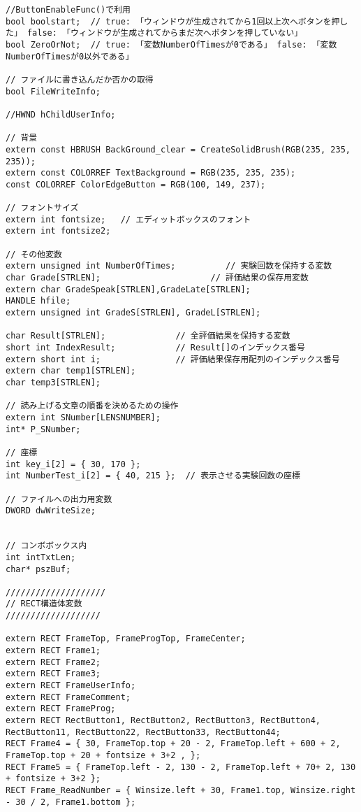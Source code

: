 \begin{verbatim}
//ButtonEnableFunc()で利用
bool boolstart;  // true: 「ウィンドウが生成されてから1回以上次へボタンを押した」 false: 「ウィンドウが生成されてからまだ次へボタンを押していない」
bool ZeroOrNot;  // true: 「変数NumberOfTimesが0である」 false: 「変数NumberOfTimesが0以外である」

// ファイルに書き込んだか否かの取得
bool FileWriteInfo;

//HWND hChildUserInfo;

// 背景
extern const HBRUSH BackGround_clear = CreateSolidBrush(RGB(235, 235, 235));
extern const COLORREF TextBackground = RGB(235, 235, 235);
const COLORREF ColorEdgeButton = RGB(100, 149, 237);

// フォントサイズ
extern int fontsize;   // エディットボックスのフォント
extern int fontsize2;

// その他変数
extern unsigned int NumberOfTimes;          // 実験回数を保持する変数
char Grade[STRLEN];                      // 評価結果の保存用変数
extern char GradeSpeak[STRLEN],GradeLate[STRLEN];
HANDLE hfile;
extern unsigned int GradeS[STRLEN], GradeL[STRLEN];

char Result[STRLEN];              // 全評価結果を保持する変数
short int IndexResult;            // Result[]のインデックス番号 
extern short int i;               // 評価結果保存用配列のインデックス番号
extern char temp1[STRLEN];
char temp3[STRLEN];

// 読み上げる文章の順番を決めるための操作
extern int SNumber[LENSNUMBER];
int* P_SNumber;

// 座標
int key_i[2] = { 30, 170 };         
int NumberTest_i[2] = { 40, 215 };  // 表示させる実験回数の座標

// ファイルへの出力用変数
DWORD dwWriteSize;


// コンボボックス内
int intTxtLen;
char* pszBuf;

////////////////////
// RECT構造体変数
///////////////////
 
extern RECT FrameTop, FrameProgTop, FrameCenter;
extern RECT Frame1;
extern RECT Frame2;
extern RECT Frame3;
extern RECT FrameUserInfo;
extern RECT FrameComment;
extern RECT FrameProg;
extern RECT RectButton1, RectButton2, RectButton3, RectButton4, RectButton11, RectButton22, RectButton33, RectButton44;
RECT Frame4 = { 30, FrameTop.top + 20 - 2, FrameTop.left + 600 + 2, FrameTop.top + 20 + fontsize + 3+2 , };
RECT Frame5 = { FrameTop.left - 2, 130 - 2, FrameTop.left + 70+ 2, 130 + fontsize + 3+2 };
RECT Frame_ReadNumber = { Winsize.left + 30, Frame1.top, Winsize.right - 30 / 2, Frame1.bottom };


\end{verbatim}
